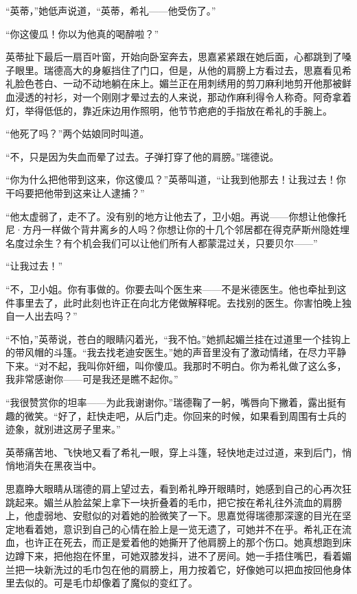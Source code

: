 \par “英蒂，”她低声说道，“英蒂，希礼——他受伤了。”
\par “你这傻瓜！你以为他真的喝醉啦？”
\par 英蒂扯下最后一扇百叶窗，开始向卧室奔去，思嘉紧紧跟在她后面，心都跳到了嗓子眼里。瑞德高大的身躯挡住了门口，但是，从他的肩膀上方看过去，思嘉看见希礼脸色苍白、一动不动地躺在床上。媚兰正在用刺绣用的剪刀麻利地剪开他那被鲜血浸透的衬衫，对一个刚刚才晕过去的人来说，那动作麻利得令人称奇。阿奇拿着灯，举得低低的，靠近床边用作照明，他节节疤疤的手指放在希礼的手腕上。
\par “他死了吗？”两个姑娘同时叫道。
\par “不，只是因为失血而晕了过去。子弹打穿了他的肩膀。”瑞德说。
\par “你为什么把他带到这来，你这傻瓜？”英蒂叫道，“让我到他那去！让我过去！你干吗要把他带到这来让人逮捕？”
\par “他太虚弱了，走不了。没有别的地方让他去了，卫小姐。再说——你想让他像托尼·方丹一样做个背井离乡的人吗？你想让你的十几个邻居都在得克萨斯州隐姓埋名度过余生？有个机会我们可以让他们所有人都蒙混过关，只要贝尔——”
\par “让我过去！”
\par “不，卫小姐。你有事做的。你要去叫个医生来——不是米德医生。他也牵扯到这件事里去了，此时此刻也许正在向北方佬做解释呢。去找别的医生。你害怕晚上独自一人出去吗？”
\par “不怕，”英蒂说，苍白的眼睛闪着光，“我不怕。”她抓起媚兰挂在过道里一个挂钩上的带风帽的斗篷。“我去找老迪安医生。”她的声音里没有了激动情绪，在尽力平静下来。“对不起，我叫你奸细，叫你傻瓜。我那时不明白。你为希礼做了这么多，我非常感谢你——可是我还是瞧不起你。”
\par “我很赞赏你的坦率——为此我谢谢你。”瑞德鞠了一躬，嘴唇向下撇着，露出挺有趣的微笑。“好了，赶快走吧，从后门走。你回来的时候，如果看到周围有士兵的迹象，就别进这房子里来。”
\par 英蒂痛苦地、飞快地又看了希礼一眼，穿上斗篷，轻快地走过过道，来到后门，悄悄地消失在黑夜当中。
\par 思嘉睁大眼睛从瑞德的肩上望过去，看到希礼睁开眼睛时，她感到自己的心再次狂跳起来。媚兰从脸盆架上拿下一块折叠着的毛巾，把它按在希礼往外流血的肩膀上，他虚弱地、安慰似的对着她的脸微笑了一下。思嘉觉得瑞德那深邃的目光在坚定地看着她，意识到自己的心情在脸上是一览无遗了，可她并不在乎。希礼正在流血，也许正在死去，而正是爱着他的她撕开了他肩膀上的那个伤口。她真想跑到床边蹲下来，把他抱在怀里，可她双膝发抖，进不了房间。她一手捂住嘴巴，看着媚兰把一块新洗过的毛巾包在他的肩膀上，用力按着它，好像她可以把血按回他身体里去似的。可是毛巾却像着了魔似的变红了。
